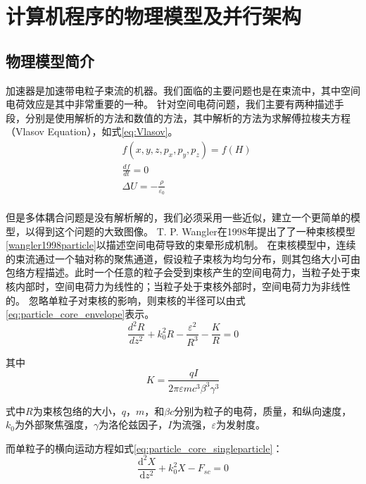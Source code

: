 
\chapter{计算机程序的物理模型及并行架构}
\label{chap:Algorithm}

\section{物理模型简介}
加速器是加速带电粒子束流的机器。我们面临的主要问题也是在束流中，其中空间电荷效应是其中非常重要的一种。
针对空间电荷问题，我们主要有两种描述手段，分别是使用解析的方法和数值的方法，其中解析的方法为求解傅拉梭夫方程（Vlasov Equation），如式\ref{eq:Vlasov}。
\begin{equation}
    \label{eq:Vlasov}
    \begin{aligned}
        & f(x,y,z,{{p}_{x}},{{p}_{y}},{{p}_{z}})=f(H) \\
        & \frac{df}{dt}=0 \\
        & \Delta U=-\frac{\rho }{{{\varepsilon }_{0}}} \\
    \end{aligned}
\end{equation}

但是多体耦合问题是没有解析解的，我们必须采用一些近似，建立一个更简单的模型，以得到这个问题的大致图像。
T. P. Wangler在1998年提出了了一种束核模型\ref{wangler1998particle}以描述空间电荷导致的束晕形成机制。
在束核模型中，连续的束流通过一个轴对称的聚焦通道，假设粒子束核为均匀分布，则其包络大小可由包络方程描述。此时一个任意的粒子会受到束核产生的空间电荷力，当粒子处于束核内部时，空间电荷力为线性的；当粒子处于束核外部时，空间电荷力为非线性的。
忽略单粒子对束核的影响，则束核的半径可以由式\ref{eq:particle_core_envelope}表示。
\begin{equation}
    \label{eq:particle_core_envelope}
    \frac{{{d}^{2}}R}{d{{z}^{2}}}+k_{0}^{2}R-\frac{{{\varepsilon }^{2}}}{{{R}^{3}}}-\frac{K}{R}=0
\end{equation}

其中
\begin{equation}
K=\frac{qI}{2\pi \varepsilon m{{c}^{3}}{{\beta }^{3}}{{\gamma }^{3}}}
\end{equation}

式中$R$为束核包络的大小，$q$，$m$，和$\beta c$分别为粒子的电荷，质量，和纵向速度，$k_{0}$为外部聚焦强度，$\gamma$为洛伦兹因子，$I$为流强，$\varepsilon$为发射度。

而单粒子的横向运动方程如式\ref{eq:particle_core_singleparticle}：
\begin{equation}
    \label{eq:particle_core_singleparticle}
    \frac{{{\text{d}}^{2}}X}{\text{d}{{z}^{2}}}+k_{0}^{2}X-{{F}_{sc}}=0
\end{equation}

